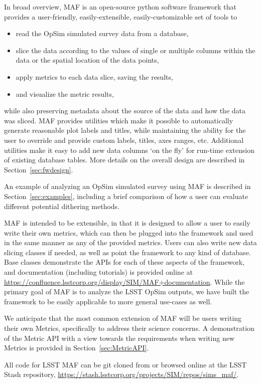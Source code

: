 \documentclass[]{spie}  %
\begin{document}
In broad overview, MAF is an open-source python software framework that
provides a user-friendly, easily-extensible, easily-customizable set of tools to 
\begin{itemize}
\item{read the OpSim simulated survey data from a database,}
\item{slice the data according to the values of single or multiple
columns within the data or the spatial location of the data points,}
\item{apply metrics to each data slice, saving the results,}
\item{and visualize the metric results,}
\end{itemize}
while also preserving metadata about the source of the data and how the
data was sliced. MAF provides utilities which make it possible
to automatically generate reasonable plot labels and titles, while
maintaining the ability for the user to override and provide custom
labels, titles, axes ranges, etc. Additional utilities make it easy to
add new data columns `on the fly' for run-time extension of
existing database tables. More details on the overall design are
described in Section~\ref{sec:fwdesign}. 

An example of analyzing an OpSim simulated survey using MAF is
described in Section~\ref{sec:examples}, including a brief comparison
of how a user can evaluate different potential dithering methods.

MAF is intended to be extensible, in that it is designed to allow a
user to easily write their own metrics, which can then be
plugged into the framework and used in the same manner as any of the
provided metrics. Users can also write new data slicing classes if
needed, as well as point the framework to any kind of database. Base
classes demonstrate the APIs for each of these aspects of the
framework, and documentation (including tutorials) is provided online
at
\url{https://confluence.lsstcorp.org/display/SIM/MAF+documentation}.  While the primary goal of
MAF is to analyze the LSST OpSim outputs, we have built the framework
to be easily applicable to more general use-cases as well. 

We anticipate that the most common extension of MAF will be users
writing their own Metrics, specifically to address their science
concerns. A demonstration of the Metric API with a view towards the
requirements when writing new Metrics is provided in Section~\ref{sec:MetricAPI}.

All code for LSST MAF can be git cloned from or browsed online at the LSST Stash 
repository, \url{https://stash.lsstcorp.org/projects/SIM/repos/sims_maf/}. 
\end{document}
